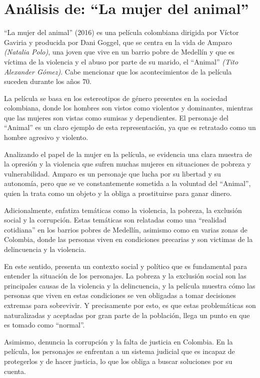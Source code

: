 \documentclass[letterpaper, 12pt]{report}
\begin{document}
\chapter*{Análisis de: ``La mujer del animal''}

\nocite{Pelicula}

``La mujer del animal'' (2016) es una película colombiana dirigida por Víctor Gaviria y
producida por Dani Goggel, que se centra en la vida de Amparo
\textit{(Natalia Polo)}, una joven que vive en un barrio pobre de Medellín
y que es víctima de la violencia y el abuso por parte de su marido, el
``Animal'' \textit{(Tito Alexander Gómez)}. Cabe mencionar que los
acontecimientos de la película suceden durante los años 70.

La película se basa en los estereotipos de género presentes
en la sociedad colombiana, donde los hombres son vistos
como violentos y dominantes, mientras que las mujeres son
vistas como sumisas y dependientes. El personaje del
``Animal'' es un claro ejemplo de esta representación, ya
que es retratado como un hombre agresivo y violento.

Analizando el papel de la mujer en la película, se
evidencia una clara muestra de la opresión y la violencia
que sufren muchas mujeres en situaciones de pobreza y
vulnerabilidad. Amparo es un personaje que lucha por su
libertad y su autonomía, pero que se ve constantemente
sometida a la voluntad del ``Animal'', quien la trata como
un objeto y la obliga a prostituirse para ganar dinero.

Adicionalmente, enfatiza temáticas como la violencia, la
pobreza, la exclusión social y la corrupción. Estas
temáticas son relatadas como una ``realidad cotidiana'' en
los barrios pobres de Medellín, asimismo como en varias
zonas de Colombia, donde las personas viven en condiciones
precarias y son victimas de la delincuencia y la violencia.

En este sentido, presenta un contexto social y político que
es fundamental para entender la situación de los
personajes. La pobreza y la exclusión social son las
principales causas de la violencia y la delincuencia, y la
película muestra cómo las personas que viven en estas
condiciones se ven obligadas a tomar decisiones extremas
para sobrevivir. Y precisamente por esto, es que estas
problemáticas son naturalizadas y aceptadas por gran parte
de la población, llega un punto en que es tomado como
``normal''.

Asimismo, denuncia la corrupción y la falta de justicia en
Colombia. En la película, los personajes se enfrentan a un
sistema judicial que es incapaz de protegerlos y de hacer
justicia, lo que los obliga a buscar soluciones por su
cuenta.
\end{document}
